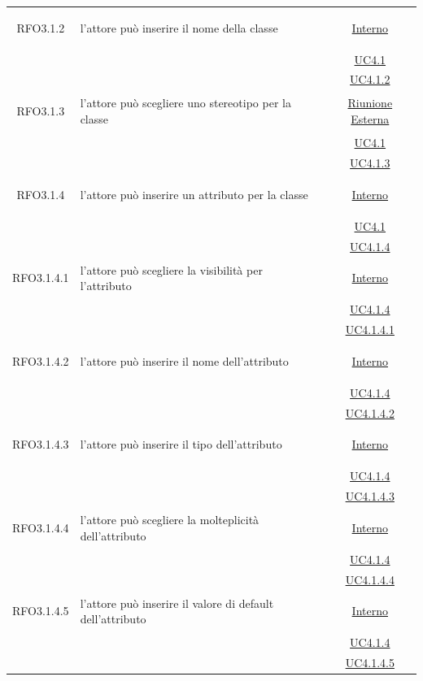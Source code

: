 \begin{longtable}{|c|>{\centering}m{7cm}|c|}
\hypertarget{RFO3.1.2}{RFO3.1.2} & l'attore può inserire il nome della classe & \hyperlink{Interno}{Interno}\\
& &\hyperref[UC4.1]{UC4.1}\\
& &\hyperref[UC4.1.2]{UC4.1.2}\\ \hline

\hypertarget{RFO3.1.3}{RFO3.1.3} & l'attore può scegliere uno stereotipo per la classe & \hyperlink{Riunione Esterna}{Riunione Esterna}\\
& &\hyperref[UC4.1]{UC4.1}\\
& &\hyperref[UC4.1.3]{UC4.1.3}\\ \hline

\hypertarget{RFO3.1.4}{RFO3.1.4} & l'attore può inserire un attributo per la classe & \hyperlink{Interno}{Interno}\\
& &\hyperref[UC4.1]{UC4.1}\\
& &\hyperref[UC4.1.4]{UC4.1.4}\\ \hline

\hypertarget{RFO3.1.4.1}{RFO3.1.4.1} & l'attore può scegliere la visibilità per l'attributo &  \hyperlink{Interno}{Interno}\\
& &\hyperref[UC4.1.4]{UC4.1.4}\\
& &\hyperref[UC4.1.4.1]{UC4.1.4.1}\\ \hline

\hypertarget{RFO3.1.4.2}{RFO3.1.4.2} & l'attore può inserire il nome dell'attributo & \hyperlink{Interno}{Interno}\\
& &\hyperref[UC4.1.4]{UC4.1.4}\\
& &\hyperref[UC4.1.4.2]{UC4.1.4.2}\\ \hline

\hypertarget{RFO3.1.4.3}{RFO3.1.4.3} & l'attore può inserire il tipo dell'attributo & \hyperlink{Interno}{Interno}\\
& &\hyperref[UC4.1.4]{UC4.1.4}\\
& &\hyperref[UC4.1.4.3]{UC4.1.4.3}\\ \hline

\hypertarget{RFO3.1.4.4}{RFO3.1.4.4} & l'attore può scegliere la molteplicità dell'attributo & \hyperlink{Interno}{Interno}\\
& &\hyperref[UC4.1.4]{UC4.1.4}\\
& &\hyperref[UC4.1.4.4]{UC4.1.4.4}\\ \hline

\hypertarget{RFO3.1.4.5}{RFO3.1.4.5} & l'attore può inserire il valore di default dell'attributo & \hyperlink{Interno}{Interno}\\
& &\hyperref[UC4.1.4]{UC4.1.4}\\
& &\hyperref[UC4.1.4.5]{UC4.1.4.5}\\ \hline


\end{longtable}

